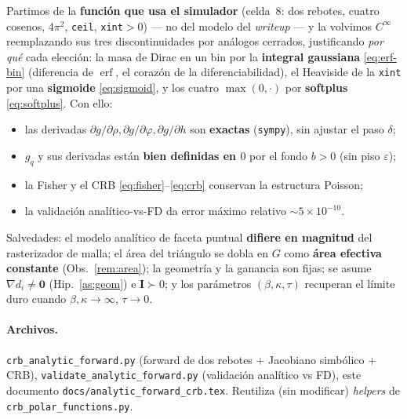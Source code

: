 \documentclass[11pt,a4paper]{article}
\theoremstyle{plain}
\theoremstyle{definition}
\newcommand{\vect}[1]{\boldsymbol{#1}}
\newcommand{\matr}[1]{\mathbf{#1}}
\newcommand{\erf}{\operatorname{erf}}
\begin{document}
Partimos de la \textbf{funci\'on que usa el simulador} (celda~8: dos rebotes,
cuatro cosenos, $4\pi^2$, \texttt{ceil}, \texttt{xint}$>0$) --- no del modelo del
\emph{writeup} --- y la volvimos $C^\infty$ reemplazando sus tres
discontinuidades por an\'alogos cerrados, justificando \emph{por qu\'e} cada
elecci\'on: la masa de Dirac en un bin por la \textbf{integral gaussiana}
\eqref{eq:erf-bin} (diferencia de $\erf$, el coraz\'on de la
diferenciabilidad), el Heaviside de la \texttt{xint} por una \textbf{sigmoide}
\eqref{eq:sigmoid}, y los cuatro $\max(0,\cdot)$ por \textbf{softplus}
\eqref{eq:softplus}. Con ello:
\begin{itemize}[nosep]
    \item las derivadas $\partial g/\partial\rho,\partial g/\partial\varphi,
          \partial g/\partial h$ son \textbf{exactas} (\texttt{sympy}), sin
          ajustar el paso $\delta$;
    \item $g_q$ y sus derivadas est\'an \textbf{bien definidas en $0$} por el
          fondo $b>0$ (sin piso $\varepsilon$);
    \item la Fisher y el CRB \eqref{eq:fisher}--\eqref{eq:crb} conservan la
          estructura Poisson;
    \item la validaci\'on anal\'itico-vs-FD da error m\'aximo relativo
          $\sim5\times10^{-10}$.
\end{itemize}
Salvedades: el modelo anal\'itico de faceta puntual \textbf{difiere en magnitud}
del rasterizador de malla; el \'area del tri\'angulo se dobla en $G$ como
\textbf{\'area efectiva constante} (Obs.~\ref{rem:area}); la geometr\'ia y la
ganancia son fijas; se asume $\nabla d_i\neq\vect0$ (Hip.~\ref{as:geom}) e
$\matr{I}\succ0$; y los par\'ametros $(\beta,\kappa,\tau)$ recuperan el l\'imite
duro cuando $\beta,\kappa\to\infty$, $\tau\to0$.

\paragraph{Archivos.}
\texttt{crb\_analytic\_forward.py} (forward de dos rebotes $+$ Jacobiano
simb\'olico $+$ CRB), \texttt{validate\_analytic\_forward.py} (validaci\'on
anal\'itico vs FD), este documento \texttt{docs/analytic\_forward\_crb.tex}.
Reutiliza (sin modificar) \emph{helpers} de \texttt{crb\_polar\_functions.py}.
\end{document}
